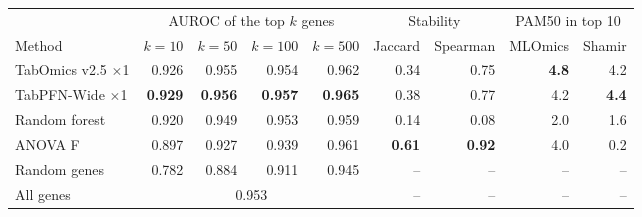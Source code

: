 \begin{tabular}{lrrrrrrrr}
\toprule
 & \multicolumn{4}{c}{AUROC of the top $k$ genes} & \multicolumn{2}{c}{Stability} & \multicolumn{2}{c}{PAM50 in top 10} \\
\cmidrule(lr){2-5} \cmidrule(lr){6-7} \cmidrule(lr){8-9}
Method & $k=10$ & $k=50$ & $k=100$ & $k=500$ & Jaccard & Spearman & MLOmics & Shamir \\
\midrule
TabOmics v2.5 $\times$1 & 0.926 & 0.955 & 0.954 & 0.962 & 0.34 & 0.75 & \textbf{4.8} & 4.2 \\
TabPFN-Wide $\times$1 & \textbf{0.929} & \textbf{0.956} & \textbf{0.957} & \textbf{0.965} & 0.38 & 0.77 & 4.2 & \textbf{4.4} \\
Random forest & 0.920 & 0.949 & 0.953 & 0.959 & 0.14 & 0.08 & 2.0 & 1.6 \\
ANOVA F & 0.897 & 0.927 & 0.939 & 0.961 & \textbf{0.61} & \textbf{0.92} & 4.0 & 0.2 \\
Random genes & 0.782 & 0.884 & 0.911 & 0.945 & -- & -- & -- & -- \\
All genes & \multicolumn{4}{c}{0.953} & -- & -- & -- & -- \\
\bottomrule
\end{tabular}
